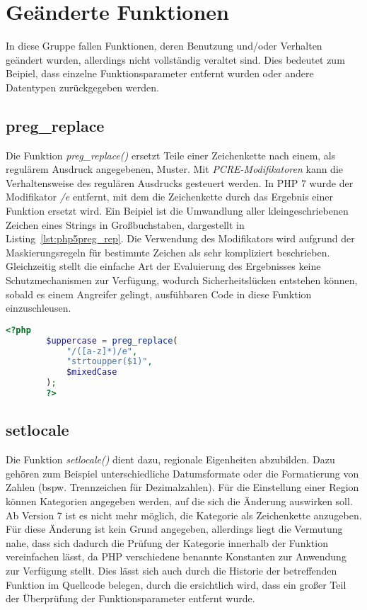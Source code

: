 \section{Geänderte Funktionen}
In diese Gruppe fallen Funktionen, deren Benutzung und/oder Verhalten geändert wurden, allerdings nicht vollständig veraltet sind. Dies bedeutet zum Beipiel, dass 
einzelne Funktionsparameter entfernt wurden oder andere Datentypen zurückgegeben werden.
    \subsection{preg\_replace} \label{preg_replace}
    Die Funktion \textit{preg\_replace()} ersetzt Teile einer Zeichenkette nach einem, als regulärem Ausdruck angegebenen, Muster. Mit \textit{\acs{PCRE}-Modifikatoren} 
    kann die Verhaltensweise des regulären Ausdrucks gesteuert werden. In \acs{PHP} 7 wurde der Modifikator \textit{/e} entfernt, mit dem die Zeichenkette durch das Ergebnis
    einer Funktion ersetzt wird. Ein Beipiel ist die Umwandlung aller kleingeschriebenen Zeichen eines Strings in Großbuchstaben, dargestellt in Listing~\ref{lst:php5preg_rep}. Die Verwendung
    des Modifikators wird aufgrund der Maskierungsregeln für bestimmte Zeichen als sehr kompliziert beschrieben. Gleichzeitig stellt die einfache Art der Evaluierung
    des Ergebnisses keine Schutzmechanismen zur Verfügung, wodurch Sicherheitslücken entstehen können, sobald es einem Angreifer gelingt, ausfühbaren Code in diese
    Funktion einzuschleusen. 

    \begin{lstlisting}[language=php, caption={Beispiel der Nutzung von preg\_replace mit dem Modifikator /e}, label={lst:php5preg_rep}]
        <?php
        $uppercase = preg_replace(
            "/([a-z]*)/e",
            "strtoupper($1)",
            $mixedCase
        );
        ?>
    \end{lstlisting}

    \subsection{setlocale}
    Die Funktion \textit{setlocale()} dient dazu, regionale Eigenheiten abzubilden. Dazu gehören zum Beispiel unterschiedliche Datumsformate oder die Formatierung von 
    Zahlen (bspw. Trennzeichen für Dezimalzahlen). Für die Einstellung einer Region können Kategorien angegeben werden, auf die sich die Änderung auswirken soll. 
    Ab Version 7 ist es nicht mehr möglich, die Kategorie als Zeichenkette anzugeben. Für diese Änderung ist kein Grund angegeben, allerdings liegt die Vermutung
    nahe, dass sich dadurch die Prüfung der Kategorie innerhalb der Funktion vereinfachen lässt, da \acs{PHP} verschiedene benannte Konstanten zur Anwendung zur Verfügung 
    stellt. Dies lässt sich auch durch die Historie der betreffenden Funktion im Quellcode belegen, durch die ersichtlich wird, dass ein großer Teil der Überprüfung
    der Funktionsparameter entfernt wurde. \cite{nikic_remove_2014}

